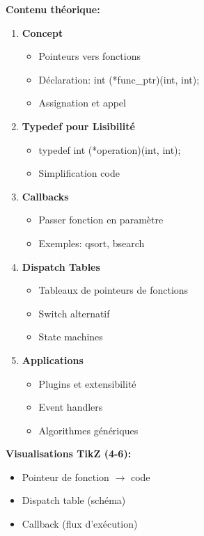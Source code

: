 \documentclass[10pt,a4paper]{article}
\begin{document}
\textbf{Contenu théorique:}
\begin{enumerate}
\item \textbf{Concept}
   \begin{itemize}
   \item Pointeurs vers fonctions
   \item Déclaration: int (*func\_ptr)(int, int);
   \item Assignation et appel
   \end{itemize}

\item \textbf{Typedef pour Lisibilité}
   \begin{itemize}
   \item typedef int (*operation)(int, int);
   \item Simplification code
   \end{itemize}

\item \textbf{Callbacks}
   \begin{itemize}
   \item Passer fonction en paramètre
   \item Exemples: qsort, bsearch
   \end{itemize}

\item \textbf{Dispatch Tables}
   \begin{itemize}
   \item Tableaux de pointeurs de fonctions
   \item Switch alternatif
   \item State machines
   \end{itemize}

\item \textbf{Applications}
   \begin{itemize}
   \item Plugins et extensibilité
   \item Event handlers
   \item Algorithmes génériques
   \end{itemize}
\end{enumerate}

\textbf{Visualisations TikZ (4-6):}
\begin{itemize}
\item Pointeur de fonction $\rightarrow$ code
\item Dispatch table (schéma)
\item Callback (flux d'exécution)
\end{itemize}
\end{document}
